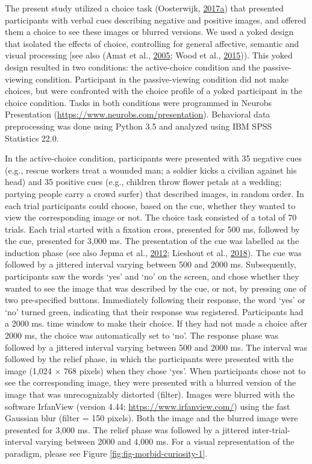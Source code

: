 \documentclass[11pt,american,]{memoir} %
\begin{document}
The present study utilized a choice task (Oosterwijk, \protect\hyperlink{ref-oosterwijk2017choosing}{2017}\protect\hyperlink{ref-oosterwijk2017choosing}{a}) that presented participants with verbal cues describing negative and positive images, and offered them a choice to see these images or blurred versions. We used a yoked design that isolated the effects of choice, controlling for general affective, semantic and visual processing {[}see also (Amat et al., \protect\hyperlink{ref-amat2005medial}{2005}; Wood et al., \protect\hyperlink{ref-wood2015controllability}{2015})). This yoked design resulted in two conditions: the active-choice condition and the passive-viewing condition. Participant in the passive-viewing condition did not make choices, but were confronted with the choice profile of a yoked participant in the choice condition. Tasks in both conditions were programmed in Neurobs Presentation (\url{https://www.neurobs.com/presentation}). Behavioral data preprocessing was done using Python 3.5 and analyzed using IBM SPSS Statistics 22.0.

In the active-choice condition, participants were presented with 35 negative cues (e.g., rescue workers treat a wounded man; a soldier kicks a civilian against his head) and 35 positive cues (e.g., children throw flower petals at a wedding; partying people carry a crowd surfer) that described images, in random order. In each trial participants could choose, based on the cue, whether they wanted to view the corresponding image or not. The choice task consisted of a total of 70 trials. Each trial started with a fixation cross, presented for 500 ms, followed by the cue, presented for 3,000 ms. The presentation of the cue was labelled as the induction phase (see also Jepma et al., \protect\hyperlink{ref-jepma2012neural}{2012}; Lieshout et al., \protect\hyperlink{ref-van2018induction}{2018}). The cue was followed by a jittered interval varying between 500 and 2000 ms. Subsequently, participants saw the words `yes' and `no' on the screen, and chose whether they wanted to see the image that was described by the cue, or not, by pressing one of two pre-specified buttons. Immediately following their response, the word `yes' or `no' turned green, indicating that their response was registered. Participants had a 2000 ms. time window to make their choice. If they had not made a choice after 2000 ms, the choice was automatically set to `no'. The response phase was followed by a jittered interval varying between 500 and 2000 ms. The interval was followed by the relief phase, in which the participants were presented with the image (1,024 × 768 pixels) when they chose `yes'. When participants chose not to see the corresponding image, they were presented with a blurred version of the image that was unrecognizably distorted (filter). Images were blurred with the software IrfanView (version 4.44; \url{https://www.irfanview.com/}) using the fast Gaussian blur (filter = 150 pixels). Both the image and the blurred image were presented for 3,000 ms. The relief phase was followed by a jittered inter-trial-interval varying between 2000 and 4,000 ms. For a visual representation of the paradigm, please see Figure \ref{fig:fig-morbid-curiosity-1}.
\end{document}
